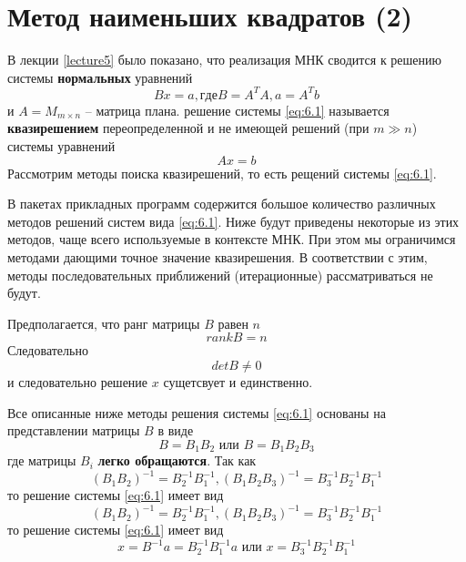 \section{Метод наименьших квадратов (2)}
\label{lecture:6}

В лекции \ref{lecture5} было показано, что реализация МНК сводится к решению системы \textbf{нормальных} уравнений 
\begin{equation} \label{eq:6.1}
	Bx = a, где B = A^TA, a = A^Tb
\end{equation}
и $A=M_{m \times n}$  -- матрица плана. решение системы \ref{eq:6.1} называется \textbf{квазирешением} переопределенной и не имеющей решений (при $m\gg n$) системы уравнений 
\begin{equation} \label{eq:6.2}
	Ax = b
\end{equation}
Рассмотрим методы поиска квазирешений, то есть рещений системы \ref{eq:6.1}. 

В пакетах прикладных программ содержится большое количество различных методов решений систем вида \ref{eq:6.1}. Ниже будут приведены некоторые из этих методов, чаще всего используемые в контексте МНК. При этом мы ограничимся методами дающими точное значение квазирешения. В соответствии с этим, методы последовательных приближений (итерационные) рассматриваться не будут.

Предполагается, что ранг матрицы $B$ равен $n$
\begin{equation} \label{eq:6.3}
	rank B = n
\end{equation}
Следовательно
\begin{equation} \label{eq:6.4}
	det B \neq 0
\end{equation}
и следовательно решение $x$ сущетсвует и единственно.

Все описанные ниже методы решения системы \ref{eq:6.1} основаны на представлении матрицы $B$ в виде
\begin{equation} \label{eq:6.5}
	B = B_1 B_2 \text{ или } B = B_1 B_2 B_3
\end{equation}
где матрицы $B_i$ \textbf{легко обращаются}.
Так как
\begin{equation} \label{eq:6.6}
	(B_1B_2)^{-1} = B_2^{-1} B_1^{-1}, (B_1B_2B_3)^{-1} = B_3^{-1}B_2^{-1} B_1^{-1}
\end{equation}
то решение системы \ref{eq:6.1} имеет вид
\begin{equation} \label{eq:6.7}
	(B_1B_2)^{-1} = B_2^{-1} B_1^{-1}, (B_1B_2B_3)^{-1} = B_3^{-1}B_2^{-1} B_1^{-1}
\end{equation}
то решение системы \ref{eq:6.1} имеет вид
\begin{equation}
	x = B^{-1} a = B_2^{-1} B_1^{-1} a \text{ или } x = B_3^{-1}B_2^{-1} B_1^{-1}
\end{equation}


